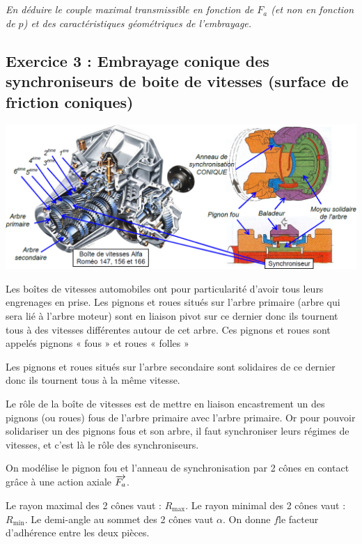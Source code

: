 \documentclass[10pt,fleqn]{article} %
\begin{document}
\begin{multicols}{2}
\begin{multicols}{2}
\subparagraph{}
\textit{En déduire le couple maximal transmissible en fonction de $F_a$ (et non en fonction de $p$) et des caractéristiques géométriques de l’embrayage.}

\subsection*{Exercice 3 : Embrayage conique des synchroniseurs de boite de vitesses (surface de friction coniques)} 
\setcounter{exo}{0}
\begin{center}
\includegraphics[width=.9\linewidth]{images/fig_08}
\end{center}

Les boîtes de vitesses automobiles ont pour particularité d'avoir tous leurs engrenages en prise. 
Les pignons et roues situés sur l’arbre primaire (arbre qui sera lié à l'arbre moteur) sont en liaison pivot sur ce dernier donc ils tournent tous à des vitesses différentes autour de cet arbre. Ces pignons et roues sont 
appelés pignons « fous » et roues « folles » 

Les pignons et roues situés sur l’arbre secondaire sont solidaires de ce dernier donc ils tournent tous à la même vitesse. 

Le rôle de la boîte de vitesses est de mettre en liaison encastrement un des pignons (ou roues) fous de l’arbre primaire avec l’arbre primaire. Or pour pouvoir solidariser un des pignons fous et son arbre, il faut synchroniser leurs régimes de vitesses, et c'est là le rôle des synchroniseurs. 

On modélise le pignon fou et l'anneau de synchronisation par 2 cônes en contact 
grâce à une action axiale $\overrightarrow{F_a}$. 
 
Le rayon maximal des 2 cônes vaut : $R_{\text{max}}$. 
Le rayon minimal des 2 cônes vaut : $R_{\text{min}}$. 
Le demi-angle au sommet des 2 cônes vaut $\alpha$. 
On donne $f$le facteur d’adhérence 
entre les deux pièces.



\end{multicols}
\end{multicols}
\end{document}
